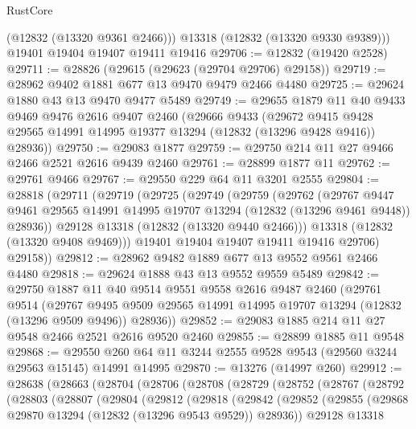\begin{lexlean}{RustCore}
\begin{coremodule}
        (@12832 (@13320 @9361 @2466)))
      @13318
      (@12832 (@13320 @9330 @9389)))
    @19401
    @19404
    @19407
    @19411
    @19416
@29706 := @12832 (@19420 @2528)
@29711 := @28826 (@29615 (@29623 (@29704 @29706) @29158))
@29719 := @28962 @9402 @1881 @677 @13 @9470 @9479 @2466 @4480
@29725 := @29624 @1880 @43 @13 @9470 @9477 @5489
@29749 := @29655
    @1879
    @11
    @40
    @9433
    @9469
    @9476
    @2616
    @9407
    @2460
    (@29666
      @9433
      (@29672 @9415 @9428 @29565 @14991 @14995 @19377 @13294 (@12832 (@13296 @9428 @9416)) @28936))
@29750 := @29083 @1877
@29759 := @29750 @214 @11 @27 @9466 @2466 @2521 @2616 @9439 @2460
@29761 := @28899 @1877 @11
@29762 := @29761 @9466
@29767 := @29550 @229 @64 @11 @3201 @2555
@29804 := @28818
    (@29711
      (@29719
        (@29725
          (@29749
            (@29759
              (@29762
                (@29767
                  @9447
                  @9461
                  @29565
                  @14991
                  @14995
                  @19707
                  @13294
                  (@12832 (@13296 @9461 @9448))
                  @28936))
              @29128
              @13318
              (@12832 (@13320 @9440 @2466)))
            @13318
            (@12832 (@13320 @9408 @9469)))
          @19401
          @19404
          @19407
          @19411
          @19416
          @29706)
        @29158))
@29812 := @28962 @9482 @1889 @677 @13 @9552 @9561 @2466 @4480
@29818 := @29624 @1888 @43 @13 @9552 @9559 @5489
@29842 := @29750
    @1887
    @11
    @40
    @9514
    @9551
    @9558
    @2616
    @9487
    @2460
    (@29761
      @9514
      (@29767 @9495 @9509 @29565 @14991 @14995 @19707 @13294 (@12832 (@13296 @9509 @9496)) @28936))
@29852 := @29083 @1885 @214 @11 @27 @9548 @2466 @2521 @2616 @9520 @2460
@29855 := @28899 @1885 @11 @9548
@29868 := @29550 @260 @64 @11 @3244 @2555 @9528 @9543 (@29560 @3244 @29563 @15145) @14991 @14995
@29870 := @13276 (@14997 @260)
@29912 := @28638
    (@28663
      (@28704
        (@28706
          (@28708
            (@28729
              (@28752
                (@28767
                  (@28792
                    (@28803
                      (@28807
                        (@29804
                          (@29812
                            (@29818
                              (@29842
                                (@29852
                                  (@29855
                                    (@29868 @29870 @13294 (@12832 (@13296 @9543 @9529)) @28936))
                                  @29128
                                  @13318

\end{coremodule}
\end{lexlean}
